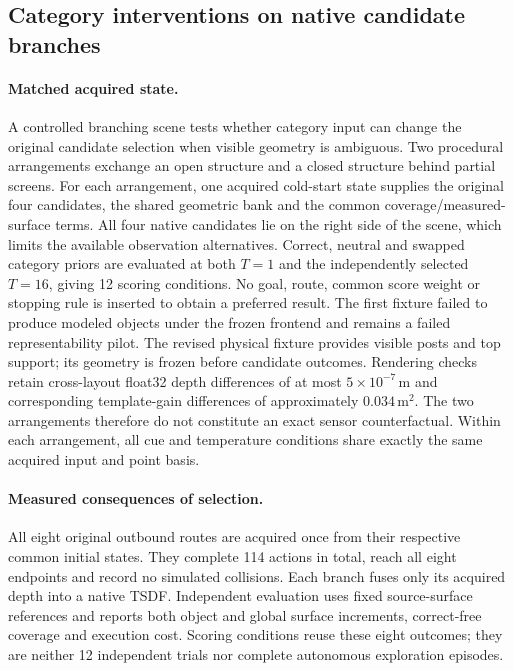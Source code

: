 \subsection{Category interventions on native candidate branches}
\label{supp:native-semantic-mechanism}

\paragraph{Matched acquired state.}
A controlled branching scene tests whether category input can change the original candidate selection when visible geometry is ambiguous. Two procedural arrangements exchange an open structure and a closed structure behind partial screens. For each arrangement, one acquired cold-start state supplies the original four candidates, the shared geometric bank and the common coverage/measured-surface terms. All four native candidates lie on the right side of the scene, which limits the available observation alternatives. Correct, neutral and swapped category priors are evaluated at both $T=1$ and the independently selected $T=16$, giving 12 scoring conditions. No goal, route, common score weight or stopping rule is inserted to obtain a preferred result. The first fixture failed to produce modeled objects under the frozen frontend and remains a failed representability pilot. The revised physical fixture provides visible posts and top support; its geometry is frozen before candidate outcomes. Rendering checks retain cross-layout float32 depth differences of at most $5\times10^{-7}$\,m and corresponding template-gain differences of approximately $0.034$\,m$^2$. The two arrangements therefore do not constitute an exact sensor counterfactual. Within each arrangement, all cue and temperature conditions share exactly the same acquired input and point basis.

\paragraph{Measured consequences of selection.}
All eight original outbound routes are acquired once from their respective common initial states. They complete 114 actions in total, reach all eight endpoints and record no simulated collisions. Each branch fuses only its acquired depth into a native TSDF. Independent evaluation uses fixed source-surface references and reports both object and global surface increments, correct-free coverage and execution cost. Scoring conditions reuse these eight outcomes; they are neither 12 independent trials nor complete autonomous exploration episodes.

